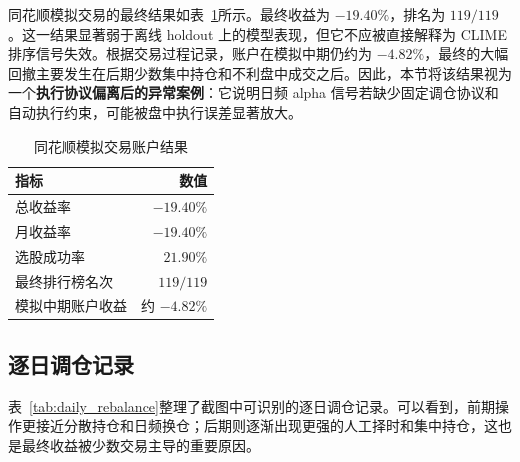 同花顺模拟交易的最终结果如表~\ref{tab:trading_summary}所示。最终收益为 $-19.40\%$，排名为 $119/119$。这一结果显著弱于离线 holdout 上的模型表现，但它不应被直接解释为 CLIME 排序信号失效。根据交易过程记录，账户在模拟中期仍约为 $-4.82\%$，最终的大幅回撤主要发生在后期少数集中持仓和不利盘中成交之后。因此，本节将该结果视为一个\textbf{执行协议偏离后的异常案例}：它说明日频 alpha 信号若缺少固定调仓协议和自动执行约束，可能被盘中执行误差显著放大。

\begin{table}[H]
    \centering
    \caption{同花顺模拟交易账户结果}
    \label{tab:trading_summary}
    \begin{tabular}{@{}lr@{}}
        \toprule
        指标 & 数值 \\
        \midrule
        总收益率 & $-19.40\%$ \\
        月收益率 & $-19.40\%$ \\
        选股成功率 & $21.90\%$ \\
        最终排行榜名次 & $119/119$ \\
        模拟中期账户收益 & 约 $-4.82\%$ \\
        \bottomrule
    \end{tabular}
\end{table}

\subsection{逐日调仓记录}

表~\ref{tab:daily_rebalance}整理了截图中可识别的逐日调仓记录。可以看到，前期操作更接近分散持仓和日频换仓；后期则逐渐出现更强的人工择时和集中持仓，这也是最终收益被少数交易主导的重要原因。

